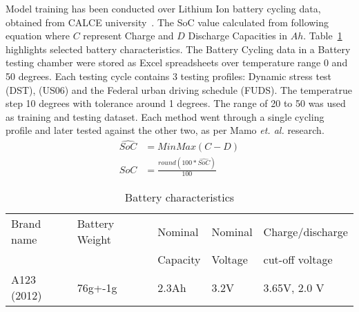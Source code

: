 Model training has been conducted over Lithium Ion battery cycling data, obtained from CALCE university~\cite{noauthor_calce_2017}.
The SoC value calculated from following equation where $C$ represent Charge and $D$ Discharge Capacities in $Ah$.
Table~\ref{tab:battery} highlights selected battery characteristics.
The Battery Cycling data in a Battery testing chamber were stored as Excel spreadsheets over temperature range 0 and 50 degrees.
Each testing cycle contains 3 testing profiles: Dynamic stress test (DST), (US06) and the Federal urban driving schedule (FUDS).
The temperatrue step 10 degrees with tolerance around 1 degrees.
The range of 20 to 50 was used as training and testing dataset.
Each method went through a single cycling profile and later tested against the other two, as per Mamo \textit{et. al.} \cite{mamo_long_2020} research.
\begin{equation}
    \begin{split}
        \hat{SoC} &= MinMax(C-D) \\
        SoC &= \frac{round(100*\hat{SoC})}{100}
    \end{split}
\end{equation}
\begin{table}[ht]
    \centering
    \caption{Battery characteristics}
    \label{tab:battery}
    \begin{tabular}{ p{2.7cm} p{2.7cm} p{2.7cm} p{2.7cm} p{2.7cm}   }
        \hline
        Brand name & Battery Weight & Nominal  & Nominal & Charge/discharge\\
                   &                & Capacity & Voltage & cut-off voltage \\
        \hline
        A123 (2012) & 76g+-1g & 2.3Ah & 3.2V & 3.65V, 2.0 V\\
        \hline
    \end{tabular}
\end{table}
